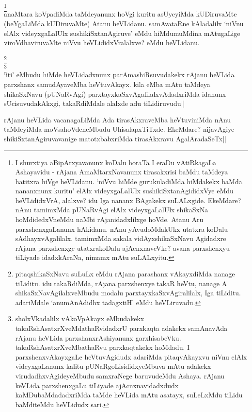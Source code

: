 \begin{artha}
\footnote[1]{I shurxtiya aBipArxyavanunx koDalu horaTa I eraDu 
vAtiRkagaLa Ashayavidu - rAjana AmaMtarxNavanunx tirasakxrisi baMdu 
taMdeya hatitxra hiVge heVLidanu. `niVvu hiMde gurukuladiMda hiMdakekx 
baMda nananxnunx kuritu' elAlx videyxgaLalUlx sushikiSxtanAgididxVye 
eMdu heVLididxVrA, alalxve? idu Iga nananx BAgakekx suLALxgide. 
EkeMdare? nAnu tamimxMda pUNaRvAgi elAlx videyxgaLalUlx shikaSxNa 
hoMdidedxVneMdu naMbi rAjanidadxlilxge hoVde. Atanu Aru 
parxshenxgaLanunx hAkidanu. nAnu yAvudoMdakUkx utatxra koDalu 
sAdhayxvAgalilalx. tamimxMda sakala vidAyxshikaSxNavu Agidadxre rAjana 
parxshenxge utatxrakoDalu ajAcnxnaveVke? avana parxshenxyu tiLiyade 
idadxkAraNa, nimamx mAtu suLALxyitu.}\\
anaMtara koVpadiMda taMdeyanunx hoVgi kuritu asUyeyiMda kUDiruvaMte 
(beYgaLiMda kUDiruvaMte) Atanu heVLidanu. samAvataRne kAladalilx 
`niVnu elAlx videyxgaLalUlx sushikiSxtanAgiruve' eMdu hiMdumuMdina 
mAtugaLige viroVdhaviruvaMte niVvu heVLididxVralalxve? eMdu heVLidanu.
\end{artha}


\begin{artha}
\footnote[2]{pitaqshikaSxNavu suLuLx eMdu rAjana parashanx vAkayxdiMda 
nanage tiLiditu. idu takaRdiMda, rAjana parxshenxye takaR heVtu, 
nanage A shikaSxNavAgilalxveMbudu modalu parxtayxkaSxvAgiralilalx, Iga 
tiLiditu. adariMdale `anumAnAdidhx tadagxtiH' eMdu heVLiruvadu.}\\
\footnote[3]{sholxVkadalilx vAkoVpAkayx eMbudakekx 
takaRshAsatxrXveMdathaRvidadxrU parxkaqta adakekx samAnavAda rAjanu 
heVLida parxshanxrAshiyanunx garxhisabeVku. takaRshAsatxrXveMbathaRvu 
parxkaqtakekx hoMdadu. I parxshenxvAkayxgaLe heVtuvAgidudx adariMda 
pitaqvAkayxvu niVnu elAlx videyxgaLanunx kalitu 
pUNaRgoLisididxyeMbuva mAtu adakekx virudadhxvAgideyeMbudu samxraNege 
baruvudeMdu Ashaya. rAjanu keVLida parxshenxgaLu tiLiyade 
ajAcnxnavidadxdudx kaMDubaMdadadxriMda taMde heVLida mAtu asatayx, 
suLeLxMdu tiLidu baMditeMdu heVLidudx sari.}\\
`iti' eMbudu hiMde heVLidadxnunx parAmashiRsuvudakekx rAjanu heVLida 
parxshanx samudAyaveMba heVtuvAkayx. kila eMba mAtu taMdeya 
shikaSxNavu (pUNaRvAgi) parxtayxkaSxvAgalilalxvAdadxriMda idanunx 
sUcisuvudakAkxgi, takaRdiMdale alalxde adu tiLidiruvudu||
\end{artha}

\begin{artha}
rAjanu heVLida vacanagaLiMda Ada tirasAkxraveMba heVtuviniMda 
nAnu taMdeyiMda moVsahoVdeneMbudu UhisalapxTiTxde. EkeMdare? 
nijavAgiye shikiSxtanAgiruvavanige matotxbabxriMda tirasAkxravu 
AgalAradaSeTx|| 
\end{artha}

